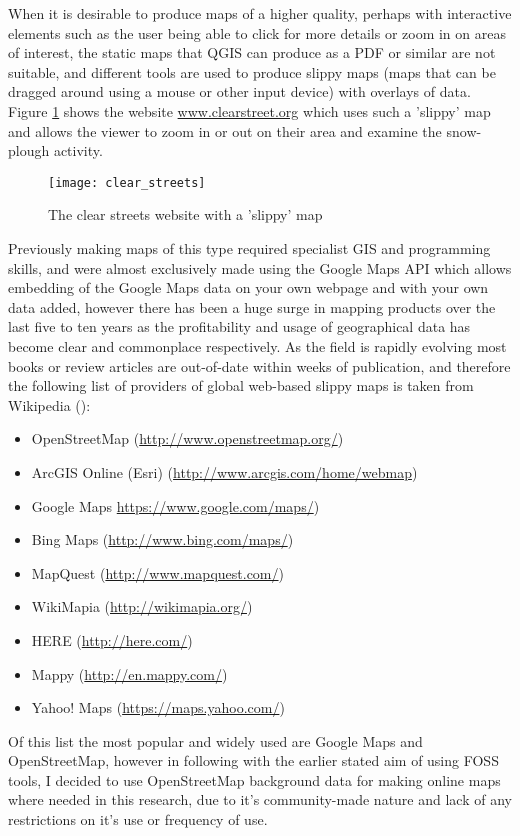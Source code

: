 When it is desirable to produce maps of a higher quality, perhaps with interactive elements such as the user being able to click for more details or zoom in on areas of interest, the static maps that QGIS can produce as a PDF or similar are not suitable, and different tools are used to produce slippy maps (maps that can be dragged around using a mouse or other input device) with overlays of data. Figure \ref{fig:clear_streets} shows the website \url{www.clearstreet.org} which uses such a 'slippy' map and allows the viewer to zoom in or out on their area and examine the snow-plough activity.

\begin{figure}[H]
\centering
\texttt{[image: clear\_streets]}
\caption{The clear streets website with a 'slippy' map}
\label{fig:clear_streets}
\end{figure}

Previously making maps of this type required specialist GIS and programming skills, and were almost exclusively made using the Google Maps API which allows embedding of the Google Maps data on your own webpage and with your own data added, however there has been a huge surge in mapping products over the last five to ten years as the profitability and usage of geographical data has become clear and commonplace respectively. As the field is rapidly evolving most books or review articles are out-of-date within weeks of publication, and therefore the following list of providers of global web-based slippy maps is taken from Wikipedia (\cite{wiki-maps-2014}):

\begin{itemize}
\item OpenStreetMap  (\url{http://www.openstreetmap.org/})
\item ArcGIS Online (Esri)  (\url{http://www.arcgis.com/home/webmap})
\item Google Maps \url{https://www.google.com/maps/})
\item Bing Maps (\url{http://www.bing.com/maps/})
\item MapQuest (\url{http://www.mapquest.com/})
\item WikiMapia (\url{http://wikimapia.org/})
\item HERE (\url{http://here.com/})
\item Mappy (\url{http://en.mappy.com/})
\item Yahoo! Maps (\url{https://maps.yahoo.com/})
\end{itemize}

Of this list the most popular and widely used are Google Maps and OpenStreetMap, however in following with the earlier stated aim of using FOSS tools, I decided to use OpenStreetMap background data for making online maps where needed in this research, due to it's community-made nature and lack of any restrictions on it's use or frequency of use.


